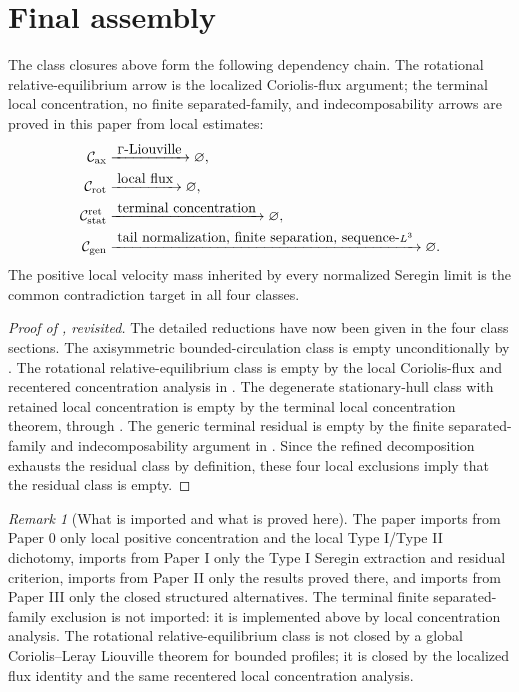 \documentclass[11pt]{amsart}
\numberwithin{equation}{section}
\theoremstyle{plain}
\theoremstyle{definition}
\theoremstyle{remark}
\newtheorem{remark}[theorem]{Remark}
\newcommand{\Cax}{\mathcal C_{\mathrm{ax}}}
\newcommand{\Crot}{\mathcal C_{\mathrm{rot}}}
\newcommand{\Cstat}{\mathcal C_{\mathrm{stat}}^{\mathrm{ret}}}
\newcommand{\Cgen}{\mathcal C_{\mathrm{gen}}}
\begin{document}
\section{Final assembly}
\label{sec:final-assembly}

The class closures above form the following dependency chain.  The
rotational relative-equilibrium arrow is the localized Coriolis-flux argument; the
terminal local concentration, no finite separated-family, and
indecomposability arrows
are proved in this paper from local estimates:
\[
\begin{aligned}
\Cax
   &\xrightarrow{\;\Gamma\hbox{-Liouville}\;}
   \varnothing,\\
\Crot
   &\xrightarrow{\;\hbox{local flux}\;}
   \varnothing,\\
\Cstat
   &\xrightarrow{\;\hbox{terminal concentration}\;}
   \varnothing,\\
\Cgen
   &\xrightarrow{\;\hbox{tail normalization, finite separation, sequence-}L^3\;}
   \varnothing .
\end{aligned}
\]
The positive local velocity mass inherited by every normalized Seregin limit is the
common contradiction target in all four classes.

\begin{proof}[Proof of , revisited]
The detailed reductions have now been given in the four class sections.  The
axisymmetric bounded-circulation class is empty unconditionally by
.  The rotational relative-equilibrium class is empty
by the local Coriolis-flux and recentered concentration analysis in
.  The degenerate stationary-hull class with
retained local concentration is empty by the terminal local concentration theorem, through
.  The generic terminal residual is empty by the
finite separated-family and indecomposability argument in
.
Since the refined decomposition exhausts the residual class by definition, these four
local exclusions imply that the residual class is empty.
\end{proof}

\begin{remark}[What is imported and what is proved here]
\label{rem:imported-vs-proved}
The paper imports from Paper 0 only local positive concentration and the local
Type I/Type II dichotomy, imports from Paper I only the Type I Seregin
extraction and residual criterion, imports from Paper II only the results proved
there, and imports from Paper III only the closed
structured alternatives.  The terminal finite separated-family exclusion is not imported:
it is implemented above by local concentration analysis.  The rotational
relative-equilibrium class is not closed by a global Coriolis--Leray Liouville
theorem for bounded profiles; it is closed by the localized flux identity
and the same recentered local concentration analysis.
\end{remark}
\end{document}
